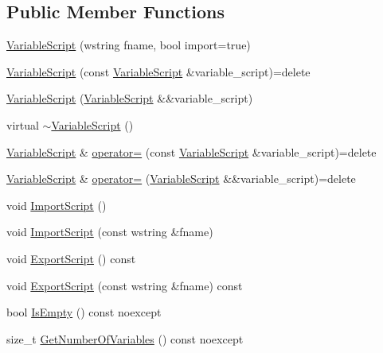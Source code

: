 \subsection*{Public Member Functions}
\begin{DoxyCompactItemize}
\item 
\hyperlink{classmage_1_1_variable_script_a87830f09a97aa8f7df3074029c5ab8d5}{Variable\+Script} (wstring fname, bool import=true)
\item 
\hyperlink{classmage_1_1_variable_script_aebd4e6cf2bdae4e57c9da428007fc4d7}{Variable\+Script} (const \hyperlink{classmage_1_1_variable_script}{Variable\+Script} \&variable\+\_\+script)=delete
\item 
\hyperlink{classmage_1_1_variable_script_acb767379c723255dd07ff2a541bc5f90}{Variable\+Script} (\hyperlink{classmage_1_1_variable_script}{Variable\+Script} \&\&variable\+\_\+script)
\item 
virtual \hyperlink{classmage_1_1_variable_script_ae7026e1283b1a1164f02fdc3e1f2b829}{$\sim$\+Variable\+Script} ()
\item 
\hyperlink{classmage_1_1_variable_script}{Variable\+Script} \& \hyperlink{classmage_1_1_variable_script_ae090b066ea939fc6611e77a47df6a97f}{operator=} (const \hyperlink{classmage_1_1_variable_script}{Variable\+Script} \&variable\+\_\+script)=delete
\item 
\hyperlink{classmage_1_1_variable_script}{Variable\+Script} \& \hyperlink{classmage_1_1_variable_script_a4602887cc8b6c45a169af7822cf744a1}{operator=} (\hyperlink{classmage_1_1_variable_script}{Variable\+Script} \&\&variable\+\_\+script)=delete
\item 
void \hyperlink{classmage_1_1_variable_script_a5f1cc3bfb611edbc8dfb433ec55cc965}{Import\+Script} ()
\item 
void \hyperlink{classmage_1_1_variable_script_ae8bbfb30b5d47b5c66cd1b45bdd2cec5}{Import\+Script} (const wstring \&fname)
\item 
void \hyperlink{classmage_1_1_variable_script_ab12b7f789f6af2b301ff350fa401b324}{Export\+Script} () const
\item 
void \hyperlink{classmage_1_1_variable_script_a05ce2bcc72418422a443bcd8eff23486}{Export\+Script} (const wstring \&fname) const
\item 
bool \hyperlink{classmage_1_1_variable_script_a01386b6b5f5440c617909c452d9df308}{Is\+Empty} () const noexcept
\item 
size\+\_\+t \hyperlink{classmage_1_1_variable_script_aea9aaa1659bceca4d22b9ab4ba4aba7a}{Get\+Number\+Of\+Variables} () const noexcept

\end{DoxyCompactItemize}
